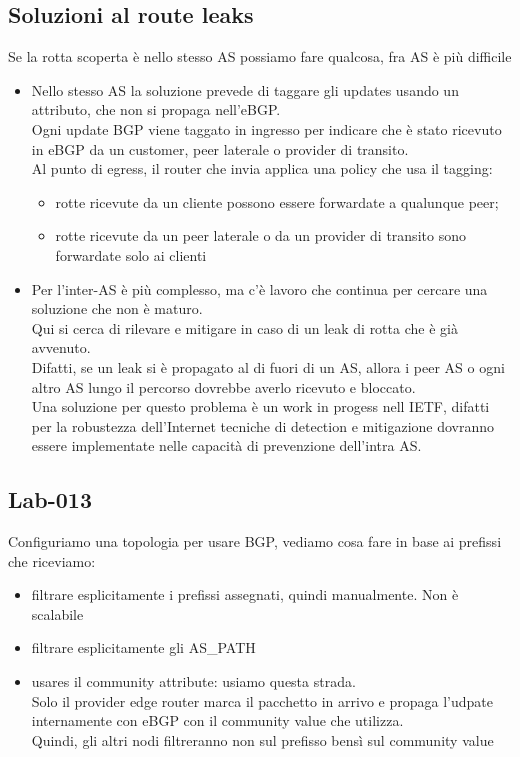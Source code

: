 \documentclass[12pt, oneside]{extbook} %
\begin{document}
\subsection{Soluzioni al route leaks}
Se la rotta scoperta è nello stesso AS possiamo fare qualcosa, fra AS è più difficile
\begin{itemize}
    \item Nello stesso AS la soluzione prevede di taggare gli updates usando un attributo, che non si propaga nell'eBGP.
    \\Ogni update BGP viene taggato in ingresso per indicare che è stato ricevuto in eBGP da un customer, peer laterale o provider di transito.
    \\Al punto di egress, il router che invia applica una policy che usa il tagging:
        \begin{itemize}
            \item rotte ricevute da un cliente possono essere forwardate a qualunque peer;
            \item rotte ricevute da un peer laterale o da un provider di transito sono forwardate solo ai clienti
        \end{itemize}
    \item Per l'inter-AS è più complesso, ma c'è lavoro che continua per cercare una soluzione che non è maturo.
    \\Qui si cerca di rilevare e mitigare in caso di un leak di rotta che è già avvenuto.
    \\Difatti, se un leak si è propagato al di fuori di un AS, allora i peer AS o ogni altro AS lungo il percorso dovrebbe averlo ricevuto e bloccato.
    \\Una soluzione per questo problema è un work in progess nell IETF, difatti per la robustezza dell'Internet tecniche di detection e mitigazione dovranno essere implementate nelle capacità di prevenzione dell'intra AS.
\end{itemize}

\subsection*{Lab-013}
Configuriamo una topologia per usare BGP, vediamo cosa fare in base ai prefissi che riceviamo:
\begin{itemize}
	\item filtrare esplicitamente i prefissi assegnati, quindi manualmente. Non è scalabile
	\item filtrare esplicitamente gli AS\_PATH
	\item usares il community attribute: usiamo questa strada.
    \\Solo il provider edge router marca il pacchetto in arrivo e propaga l'udpate internamente con eBGP con il community value che utilizza.
    \\Quindi, gli altri nodi filtreranno non sul prefisso bensì sul community value
\end{itemize}
\end{document}
